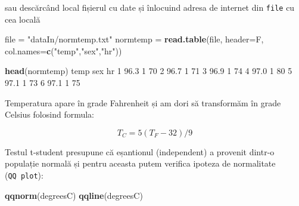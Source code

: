 \documentclass[]{article}
\newenvironment{Shaded}{\begin{snugshade}}{\end{snugshade}}
\newcommand{\KeywordTok}[1]{\textcolor[rgb]{0.13,0.29,0.53}{\textbf{#1}}}
\newcommand{\DataTypeTok}[1]{\textcolor[rgb]{0.13,0.29,0.53}{#1}}
\newcommand{\DecValTok}[1]{\textcolor[rgb]{0.00,0.00,0.81}{#1}}
\newcommand{\FloatTok}[1]{\textcolor[rgb]{0.00,0.00,0.81}{#1}}
\newcommand{\StringTok}[1]{\textcolor[rgb]{0.31,0.60,0.02}{#1}}
\newcommand{\OperatorTok}[1]{\textcolor[rgb]{0.81,0.36,0.00}{\textbf{#1}}}
\newcommand{\NormalTok}[1]{#1}
\begin{document}
sau descărcând local fișierul cu date și înlocuind adresa de internet
din \texttt{file} cu cea locală

\begin{Shaded}
\begin{Highlighting}[]
\NormalTok{file =}\StringTok{ "dataIn/normtemp.txt"}
\NormalTok{normtemp =}\StringTok{ }\KeywordTok{read.table}\NormalTok{(file, }\DataTypeTok{header=}\NormalTok{F, }\DataTypeTok{col.names=}\KeywordTok{c}\NormalTok{(}\StringTok{"temp"}\NormalTok{,}\StringTok{"sex"}\NormalTok{,}\StringTok{"hr"}\NormalTok{))}

\KeywordTok{head}\NormalTok{(normtemp)}
\NormalTok{  temp sex hr}
\DecValTok{1} \FloatTok{96.3}   \DecValTok{1} \DecValTok{70}
\DecValTok{2} \FloatTok{96.7}   \DecValTok{1} \DecValTok{71}
\DecValTok{3} \FloatTok{96.9}   \DecValTok{1} \DecValTok{74}
\DecValTok{4} \FloatTok{97.0}   \DecValTok{1} \DecValTok{80}
\DecValTok{5} \FloatTok{97.1}   \DecValTok{1} \DecValTok{73}
\DecValTok{6} \FloatTok{97.1}   \DecValTok{1} \DecValTok{75}
\end{Highlighting}
\end{Shaded}

Temperatura apare în grade Fahrenheit și am dori să transformăm în grade
Celsius folosind formula:

\[
  T_C = 5(T_F-32)/9
\]

\begin{Shaded}
\end{Shaded}

Testul t-student presupune că eșantionul (independent) a provenit
dintr-o populație normală și pentru aceasta putem verifica ipoteza de
normalitate (\texttt{QQ\ plot}):

\begin{Shaded}
\begin{Highlighting}[]
\KeywordTok{qqnorm}\NormalTok{(degreesC)}
\KeywordTok{qqline}\NormalTok{(degreesC)}
\end{Highlighting}
\end{Shaded}
\end{document}

